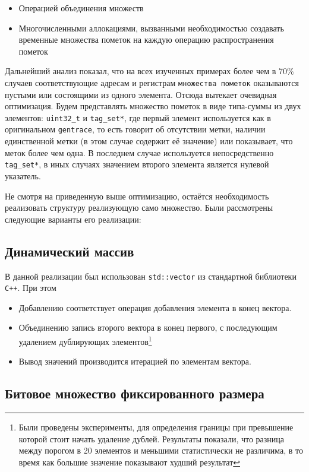\begin{itemize}
    \item Операцией объединения множеств
    \item Многочисленными аллокациями, вызванными необходимостью создавать временные множества пометок на каждую операцию распространения пометок
\end{itemize}

Дальнейший анализ показал, что на всех изученных примерах более чем в 70\% случаев соответствующие адресам и регистрам \texttt{множества пометок} оказываются пустыми или состоящими из одного элемента. Отсюда вытекает очевидная оптимизация. Будем представлять множество пометок в виде типа-суммы из двух элементов: \texttt{uint32\_t} и \texttt{tag\_set*}, где первый элемент используется как в оригинальном \texttt{gentrace}, то есть говорит об отсутствии метки, наличии единственной метки (в этом случае содержит её значение) или показывает, что меток более чем одна. В последнем случае используется непосредственно \texttt{tag\_set*}, в иных случаях значением второго элемента является нулевой указатель.

Не смотря на приведенную выше оптимизацию, остаётся необходимость реализовать структуру реализующую само множество. Были рассмотрены следующие варианты его реализации:


\subsection{Динамический массив}

В данной реализации был использован \texttt{std::vector} из стандартной библиотеки \texttt{C++}. При этом 
\begin{itemize}
    \item Добавлению соответствует операция добавления элемента в конец вектора.
    \item Объединению запись второго вектора в конец первого, с последующим удалением дублирующих элементов\footnote{Были проведены эксперименты, для определения границы при превышение которой стоит начать удаление дублей. Результаты показали, что разница между порогом в 20 элементов и меньшими статистически не различима, в то время как большие значение показывают худший результат}
    \item Вывод значений производится итерацией по элементам вектора.
\end{itemize}

\subsection{Битовое множество фиксированного размера}


